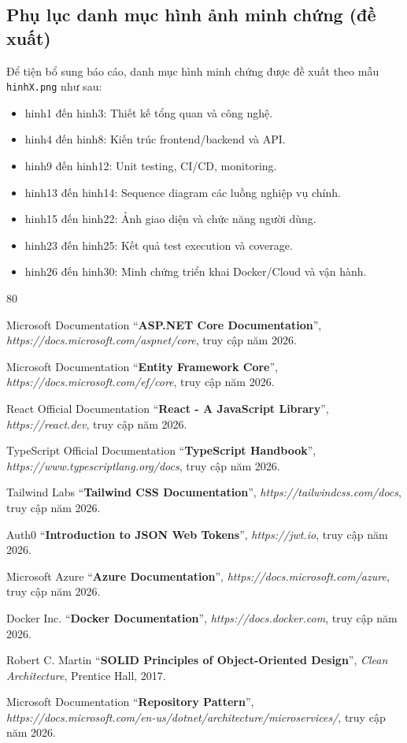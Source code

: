 \documentclass[a4paper]{article}
\begin{document}
    \subsection{Phụ lục danh mục hình ảnh minh chứng (đề xuất)}
    Để tiện bổ sung báo cáo, danh mục hình minh chứng được đề xuất theo mẫu \texttt{hinhX.png} như sau:
    \begin{itemize}
        \item hinh1 đến hinh3: Thiết kế tổng quan và công nghệ.
        \item hinh4 đến hinh8: Kiến trúc frontend/backend và API.
        \item hinh9 đến hinh12: Unit testing, CI/CD, monitoring.
        \item hinh13 đến hinh14: Sequence diagram các luồng nghiệp vụ chính.
        \item hinh15 đến hinh22: Ảnh giao diện và chức năng người dùng.
        \item hinh23 đến hinh25: Kết quả test execution và coverage.
        \item hinh26 đến hinh30: Minh chứng triển khai Docker/Cloud và vận hành.
    \end{itemize}
\begin{thebibliography}{80}

Microsoft Documentation
``\textbf{ASP.NET Core Documentation}'',
\textit{https://docs.microsoft.com/aspnet/core}, truy cập năm 2026.

Microsoft Documentation
``\textbf{Entity Framework Core}'',
\textit{https://docs.microsoft.com/ef/core}, truy cập năm 2026.

React Official Documentation
``\textbf{React - A JavaScript Library}'',
\textit{https://react.dev}, truy cập năm 2026.

TypeScript Official Documentation
``\textbf{TypeScript Handbook}'',
\textit{https://www.typescriptlang.org/docs}, truy cập năm 2026.

Tailwind Labs
``\textbf{Tailwind CSS Documentation}'',
\textit{https://tailwindcss.com/docs}, truy cập năm 2026.

Auth0
``\textbf{Introduction to JSON Web Tokens}'',
\textit{https://jwt.io}, truy cập năm 2026.

Microsoft Azure
``\textbf{Azure Documentation}'',
\textit{https://docs.microsoft.com/azure}, truy cập năm 2026.

Docker Inc.
``\textbf{Docker Documentation}'',
\textit{https://docs.docker.com}, truy cập năm 2026.

Robert C. Martin
``\textbf{SOLID Principles of Object-Oriented Design}'',
\textit{Clean Architecture}, Prentice Hall, 2017.

Microsoft Documentation
``\textbf{Repository Pattern}'',
\textit{https://docs.microsoft.com/en-us/dotnet/architecture/microservices/}, truy cập năm 2026.

\end{thebibliography}
\end{document}
